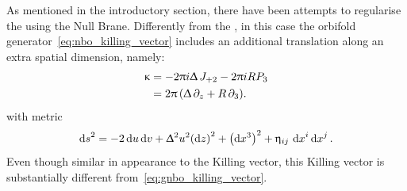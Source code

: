 As mentioned in the introductory section, there have been attempts to regularise the \nbo using the Null Brane.
Differently from the \nbo, in this case the orbifold generator~\eqref{eq:nbo_killing_vector} includes an additional translation along an extra spatial dimension, namely:
\begin{equation}
  \begin{split}
    \upkappa & = - 2 \uppi i \Updelta\, J_{+2} - 2 \uppi i R P_3
    \\
    & =
    2 \uppi\, (\Updelta\, \partial_{z} + R\, \partial_{3}).
  \end{split}
\end{equation}
with metric
\begin{equation}
  \dd{s}^2
  =
  -2 \dd{u} \dd{v}
  +
  \Updelta^2 u^2 \qty(\dd{z})^2
  +
  \qty(\dd{x^3})^2
  +
  \upeta_{ij}\, \dd{x}^i \dd{x}^j.
\end{equation}
Even though similar in appearance to the \gnbo Killing vector, this Killing vector is substantially different from~\eqref{eq:gnbo_killing_vector}.

